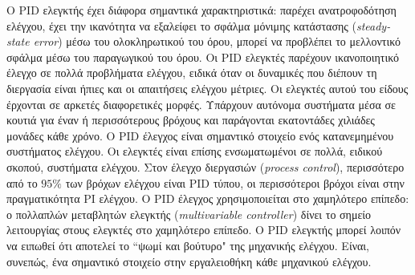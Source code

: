 Ο PID ελεγκτής έχει διάφορα σημαντικά χαρακτηριστικά: παρέχει ανατροφοδότηση ελέγχου, έχει την ικανότητα να εξαλείφει το σφάλμα μόνιμης κατάστασης (\emph{steady-state error}) μέσω του ολοκληρωτικού του όρου, μπορεί να προβλέπει το μελλοντικό σφάλμα μέσω του παραγωγικού του όρου. Οι PID ελεγκτές παρέχουν ικανοποιητικό έλεγχο σε πολλά προβλήματα ελέγχου, ειδικά όταν οι δυναμικές που διέπουν τη διεργασία είναι ήπιες και οι απαιτήσεις ελέγχου μέτριες. Οι ελεγκτές αυτού του είδους έρχονται σε αρκετές διαφορετικές μορφές. Υπάρχουν αυτόνομα συστήματα μέσα σε κουτιά για έναν ή περισσότερους βρόχους και παράγονται εκατοντάδες χιλιάδες μονάδες κάθε χρόνο. Ο PID έλεγχος είναι σημαντικό στοιχείο ενός κατανεμημένου συστήματος ελέγχου. Οι ελεγκτές είναι επίσης ενσωματωμένοι σε πολλά, ειδικού σκοπού, συστήματα ελέγχου. Στον έλεγχο διεργασιών (\emph{process control}), περισσότερο από το $95\%$ των βρόχων ελέγχου είναι PID τύπου, οι περισσότεροι βρόχοι είναι στην πραγματικότητα PI ελέγχου. Ο PID έλεγχος χρησιμοποιείται στο χαμηλότερο επίπεδο: ο πολλαπλών μεταβλητών ελεγκτής (\emph{multivariable controller}) δίνει το σημείο λειτουργίας στους ελεγκτές στο χαμηλότερο επίπεδο. Ο PID ελεγκτής μπορεί λοιπόν να ειπωθεί ότι αποτελεί το ``ψωμί και βούτυρο" της μηχανικής ελέγχου. Είναι, συνεπώς, ένα σημαντικό στοιχείο στην εργαλειοθήκη κάθε μηχανικού ελέγχου.







